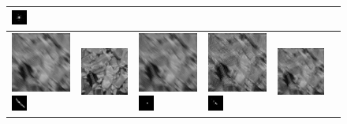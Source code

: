 \begin{figure}
\begin{tabular}{|l|l|l|l|l|l|}
\includegraphics[width=0.5cm]{results/chocolate_kernel2_MAPkreg_k.png}
\\ 
 \hline\includegraphics[width=2.5cm]{results/chocolate_kernel3_blurred.png}
\includegraphics[width=0.5cm]{images/kernel3}
& \includegraphics[width=2.5cm]{results/chocolate_kernel3_nonblind_deconv.png}
&\includegraphics[width=2.5cm]{results/chocolate_kernel3_MAPxk_x.png}
\includegraphics[width=0.5cm]{results/chocolate_kernel3_MAPxk_k.png}
&\includegraphics[width=2.5cm]{results/chocolate_kernel3_MAPk_x.png}
\includegraphics[width=0.5cm]{results/chocolate_kernel3_MAPk_k.png}
&\includegraphics[width=2.5cm]{results/chocolate_kernel3_MAPkreg_x.png}

\end{tabular}
\end{figure}
